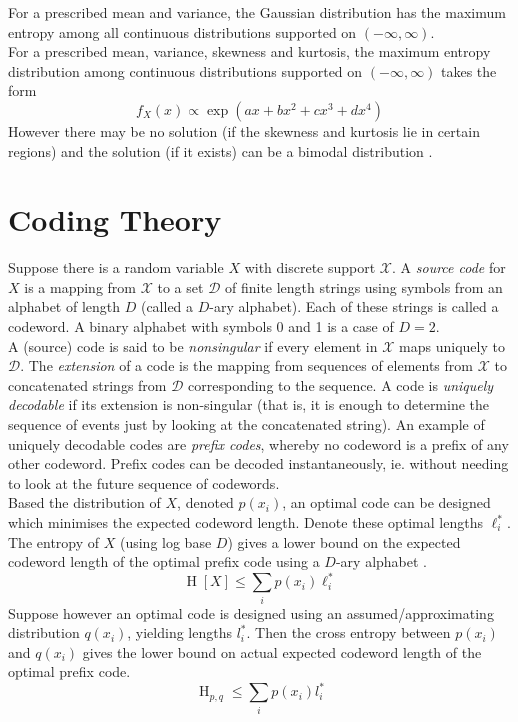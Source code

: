 \documentclass[11pt]{report} %
\begin{document}
For a prescribed mean and variance, the Gaussian distribution has the maximum entropy among all continuous distributions supported on $\left(-\infty, \infty\right)$. \\

For a prescribed mean, variance, skewness and kurtosis, the maximum entropy distribution among continuous distributions supported on $\left(-\infty, \infty\right)$ takes the form
\begin{equation}
f_{X}\left(x\right) \propto \exp\left(ax + bx^{2} + cx^{3} + dx^{4}\right)
\end{equation}
However there may be no solution (if the skewness and kurtosis lie in certain regions) and the solution (if it exists) can be a bimodal distribution \cite{Rockinger2002}.

\section{Coding Theory \cite{Cover2006}}

Suppose there is a random variable $X$ with discrete support $\mathcal{X}$. A \textit{source code} for $X$ is a mapping from $\mathcal{X}$ to a set $\mathcal{D}$ of finite length strings using symbols from an alphabet of length $D$ (called a $D$-ary alphabet). Each of these strings is called a codeword. A binary alphabet with symbols 0 and 1 is a case of $D = 2$. \\

A (source) code is said to be \textit{nonsingular} if every element in $\mathcal{X}$ maps uniquely to $\mathcal{D}$. The \textit{extension} of a code is the mapping from sequences of elements from $\mathcal{X}$ to concatenated strings from $\mathcal{D}$ corresponding to the sequence. A code is \textit{uniquely decodable} if its extension is non-singular (that is, it is enough to determine the sequence of events just by looking at the concatenated string). An example of uniquely decodable codes are \textit{prefix codes}, whereby no codeword is a prefix of any other codeword. Prefix codes can be decoded instantaneously, ie. without needing to look at the future sequence of codewords. \\

Based the distribution of $X$, denoted $p\left(x_{i}\right)$, an optimal code can be designed which minimises the expected codeword length. Denote these optimal lengths $\ell_{i}^{*}$. The entropy of $X$ (using log base $D$) gives a lower bound on the expected codeword length of the optimal prefix code using a $D$-ary alphabet \cite{Cover2006}.
\begin{equation}
\operatorname{H}\left[X\right] \leq \sum_{i}p\left(x_{i}\right)\ell_{i}^{*}
\end{equation}
Suppose however an optimal code is designed using an assumed/approximating distribution $q\left(x_{i}\right)$, yielding lengths $l_{i}^{*}$. Then the cross entropy between $p\left(x_{i}\right)$ and $q\left(x_{i}\right)$ gives the lower bound on actual expected codeword length of the optimal prefix code.
\begin{equation}
\operatorname{H}_{p, q} \leq \sum_{i}p\left(x_{i}\right)l_{i}^{*}
\end{equation}
\end{document}
